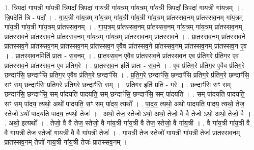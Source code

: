 \documentclass[17pt]{extarticle}
\begin{document}
1. त्रि॒पदा॑ गाय॒त्री गा॑य॒त्री त्रि॒पदा᳚ त्रि॒पदा॑ गाय॒त्री गा॑य॒त्रम् गा॑य॒त्रम् गा॑य॒त्री त्रि॒पदा᳚ त्रि॒पदा॑ गाय॒त्री गा॑य॒त्रम् । . त्रि॒पदेति॑ त्रि - पदा᳚ । . गा॒य॒त्री गा॑य॒त्रम् गा॑य॒त्रम् गा॑य॒त्री गा॑य॒त्री गा॑य॒त्रम् प्रा॑तस्सव॒नम् प्रा॑तस्सव॒नम् गा॑य॒त्रम् गा॑य॒त्री गा॑य॒त्री गा॑य॒त्रम् प्रा॑तस्सव॒नम् । . गा॒य॒त्रम् प्रा॑तस्सव॒नम् प्रा॑तस्सव॒नम् गा॑य॒त्रम् गा॑य॒त्रम् प्रा॑तस्सव॒नम् प्रा॑तस्सव॒ने प्रा॑तस्सव॒ने प्रा॑तस्सव॒नम् गा॑य॒त्रम् गा॑य॒त्रम् प्रा॑तस्सव॒नम् प्रा॑तस्सव॒ने । . प्रा॒त॒स्स॒व॒नम् प्रा॑तस्सव॒ने प्रा॑तस्सव॒ने प्रा॑तस्सव॒नम् प्रा॑तस्सव॒नम् प्रा॑तस्सव॒न ए॒वैव प्रा॑तस्सव॒ने प्रा॑तस्सव॒नम् प्रा॑तस्सव॒नम् प्रा॑तस्सव॒न ए॒व । . प्रा॒त॒स्स॒व॒नमिति॑ प्रातः - स॒व॒नम् । . प्रा॒त॒स्स॒व॒न ए॒वैव प्रा॑तस्सव॒ने प्रा॑तस्सव॒न ए॒व प्र॑तिग॒रे प्र॑तिग॒र ए॒व प्रा॑तस्सव॒ने प्रा॑तस्सव॒न ए॒व प्र॑तिग॒रे । . प्रा॒त॒स्स॒व॒न इति॑ प्रातः - स॒व॒ने । . ए॒व प्र॑तिग॒रे प्र॑तिग॒र ए॒वैव प्र॑तिग॒रे छन्दाꣳ॑सि॒ छन्दाꣳ॑सि प्रतिग॒र ए॒वैव प्र॑तिग॒रे छन्दाꣳ॑सि । . प्र॒ति॒ग॒रे छन्दाꣳ॑सि॒ छन्दाꣳ॑सि प्रतिग॒रे प्र॑तिग॒रे छन्दाꣳ॑सि॒ सꣳ सम् छन्दाꣳ॑सि प्रतिग॒रे प्र॑तिग॒रे छन्दाꣳ॑सि॒ सम् । . प्र॒ति॒ग॒र इति॑ प्रति - ग॒रे । . छन्दाꣳ॑सि॒ सꣳ सम् छन्दाꣳ॑सि॒ छन्दाꣳ॑सि॒ सम् पा॑दयति पादयति॒ सम् छन्दाꣳ॑सि॒ छन्दाꣳ॑सि॒ सम् पा॑दयति । . सम् पा॑दयति पादयति॒ सꣳ सम् पा॑दय॒ त्यथो॒ अथो॑ पादयति॒ सꣳ सम् पा॑दय॒ त्यथो᳚ । . पा॒द॒य॒ त्यथो॒ अथो॑ पादयति पादय॒ त्यथो॒ तेज॒ स्तेजो ऽथो॑ पादयति पादय॒ त्यथो॒ तेजः॑ । . अथो॒ तेज॒ स्तेजो ऽथो॒ अथो॒ तेजो॒ वै वै तेजो ऽथो॒ अथो॒ तेजो॒ वै । . अथो॒ इत्यथो᳚ । . तेजो॒ वै वै तेज॒ स्तेजो॒ वै गा॑य॒त्री गा॑य॒त्री वै तेज॒ स्तेजो॒ वै गा॑य॒त्री । . वै गा॑य॒त्री गा॑य॒त्री वै वै गा॑य॒त्री तेज॒ स्तेजो॑ गाय॒त्री वै वै गा॑य॒त्री तेजः॑ । . गा॒य॒त्री तेज॒ स्तेजो॑ गाय॒त्री गा॑य॒त्री तेजः॑ प्रातस्सव॒नम् प्रा॑तस्सव॒नम् तेजो॑ गाय॒त्री गा॑य॒त्री तेजः॑ प्रातस्सव॒नम् । \newline
\end{document}
